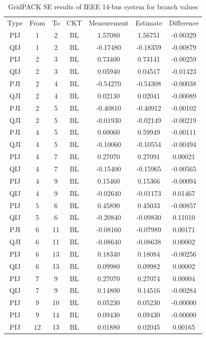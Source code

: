 \documentclass[a4paper]{article}
\begin{document}
\begin{table} [ht]
\centering
\begin{tabular} {c|c|c|c|c|c|c}
\hline
    Type & From& To & CKT & Measurement & Estimate &   Difference \\
    PIJ  &  1  &  2 &  BL &   1.57080 &   1.56751 &      -0.00329 \\
    QIJ  &  1  &  2 &  BL &  -0.17480 &  -0.18359 &      -0.00879 \\
    PIJ  &  2  &  3 &  BL &   0.73400 &   0.73141 &      -0.00259 \\
    QIJ  &  2  &  3 &  BL &   0.05940 &   0.04517 &      -0.01423 \\
    PJI  &  2  &  4 &  BL &  -0.54270 &  -0.54308 &      -0.00038 \\
    QJI  &  2  &  4 &  BL &   0.02130 &   0.02041 &      -0.00089 \\
    PJI  &  2  &  5 &  BL &  -0.40810 &  -0.40912 &      -0.00102 \\
    QJI  &  2  &  5 &  BL &  -0.01930 &  -0.02149 &      -0.00219 \\
    PJI  &  4  &  5 &  BL &   0.60060 &   0.59949 &      -0.00111 \\
    QJI  &  4  &  5 &  BL &  -0.10060 &  -0.10554 &      -0.00494 \\
    PIJ  &  4  &  7 &  BL &   0.27070 &   0.27091 &       0.00021 \\
    QIJ  &  4  &  7 &  BL &  -0.15400 &  -0.15965 &      -0.00565 \\      
    PIJ  &  4  &  9 &  BL &   0.15460 &   0.15366 &      -0.00094 \\    
    QIJ  &  4  &  9 &  BL &  -0.02640 &  -0.01173 &       0.01467 \\ 
    PIJ  &  5  &  6 &  BL &   0.45890 &   0.45033 &      -0.00857 \\
    QIJ  &  5  &  6 &  BL &  -0.20840 &  -0.09830 &       0.11010 \\
    PJI  &  6  &  11&  BL &  -0.08160 &  -0.07989 &       0.00171 \\
    QJI  &  6  &  11&  BL &  -0.08640 &  -0.08638 &       0.00002 \\
    PIJ  &  6  &  13&  BL &   0.18340 &   0.18084 &      -0.00256 \\
    QIJ  &  6  &  13&  BL &   0.09980 &   0.09982 &       0.00002 \\
    PIJ  &  7  &  9 &  BL &   0.27070 &   0.27074 &       0.00004 \\
    QIJ  &  7  &  9 &  BL &   0.14800 &   0.14516 &      -0.00284 \\
    PIJ  &  9  &  10&  BL &   0.05230 &   0.05230 &      -0.00000 \\
    PIJ  &  9  &  14&  BL &   0.09430 &   0.09430 &      -0.00000 \\
    PIJ  &  12 &  13&  BL &   0.01880 &   0.02045 &       0.00165 \\
\hline
\end{tabular}
\caption{GridPACK SE results of IEEE 14-bus system for branch values} \label{tab:GridPACKSEBranch} 
\end{table}
\end{document}

